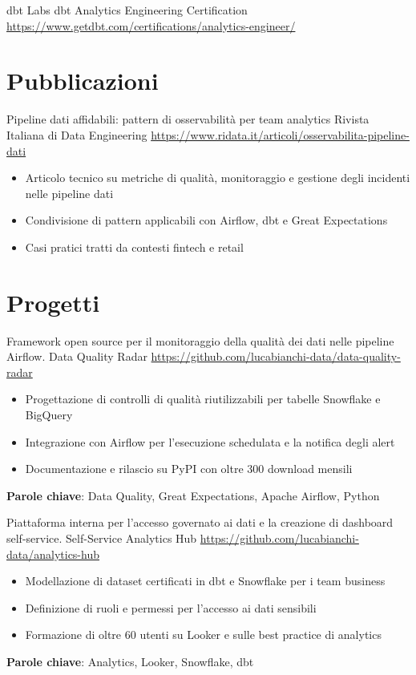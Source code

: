 \documentclass[a4paper, serif, 10pt]{moderncv}
\begin{document}
        {dbt Labs}
        {dbt Analytics Engineering Certification}
        {\url{https://www.getdbt.com/certifications/analytics-engineer/}}
        {}
        {}
\section{Pubblicazioni}

        {Pipeline dati affidabili: pattern di osservabilità per team analytics}
        {Rivista Italiana di Data Engineering}
        {\url{https://www.ridata.it/articoli/osservabilita-pipeline-dati}}
        {}
        {\begin{itemize}
\item Articolo tecnico su metriche di qualità, monitoraggio e gestione degli incidenti nelle pipeline dati
\item Condivisione di pattern applicabili con Airflow, dbt e Great Expectations
\item Casi pratici tratti da contesti fintech e retail
\end{itemize}}
\section{Progetti}

        {Framework open source per il monitoraggio della qualità dei dati nelle pipeline Airflow.}
        {Data Quality Radar}
        {\url{https://github.com/lucabianchi-data/data-quality-radar}}
        {}
        {\begin{itemize}
\item Progettazione di controlli di qualità riutilizzabili per tabelle Snowflake e BigQuery
\item Integrazione con Airflow per l'esecuzione schedulata e la notifica degli alert
\item Documentazione e rilascio su PyPI con oltre 300 download mensili
\end{itemize}
\textbf{Parole chiave}: Data Quality, Great Expectations, Apache Airflow, Python}

        {Piattaforma interna per l'accesso governato ai dati e la creazione di dashboard self-service.}
        {Self-Service Analytics Hub}
        {\url{https://github.com/lucabianchi-data/analytics-hub}}
        {}
        {\begin{itemize}
\item Modellazione di dataset certificati in dbt e Snowflake per i team business
\item Definizione di ruoli e permessi per l'accesso ai dati sensibili
\item Formazione di oltre 60 utenti su Looker e sulle best practice di analytics
\end{itemize}
\textbf{Parole chiave}: Analytics, Looker, Snowflake, dbt}
\end{document}
